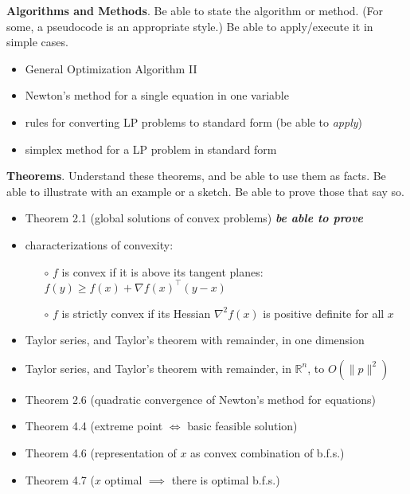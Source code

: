 \documentclass[12pt]{amsart}
\newcommand{\bigspacing}{\renewcommand{\baselinestretch}{1.13}\tiny\normalsize}
\newcommand{\RR}{{\mathbb{R}}}
\newcommand{\grad}{\nabla}
\begin{document}
\bigspacing
\noindent \textbf{Algorithms and Methods}.  Be able to state the algorithm or method.  (For some, a pseudocode is an appropriate style.)  Be able to apply/execute it in simple cases.
\begin{itemize}
\item General Optimization Algorithm II 
\item Newton's method for a single equation in one variable 
\item rules for converting LP problems to standard form (be able to \emph{apply}) 
\item simplex method for a LP problem in standard form 
\end{itemize}


\newcommand{\proveit}{\quad\textbf{\emph{be able to prove}}}

\newpage
\medskip
\noindent \textbf{Theorems}.  Understand these theorems, and be able to use them as facts.  Be able to illustrate with an example or a sketch.  Be able to prove those that say so.
\begin{itemize}
\item Theorem 2.1 (global solutions of convex problems) \proveit {}
\item characterizations of convexity: 
    \begin{itemize}
    \item[$\circ$] $f$ is convex if it is above its tangent planes: $f(y) \ge f(x) + \grad f(x)^\top (y-x)$
    \item[$\circ$] $f$ is strictly convex if its Hessian $\grad^2 f(x)$ is positive definite for all $x$
    \end{itemize}
\item Taylor series, and Taylor's theorem with remainder, in one dimension 
\item Taylor series, and Taylor's theorem with remainder, in $\RR^n$, to $O(\|p\|^2)$ 
\item Theorem 2.6 (quadratic convergence of Newton's method for equations) 
\item Theorem 4.4 (extreme point $\iff$ basic feasible solution) 
\item Theorem 4.6 (representation of $x$ as convex combination of b.f.s.) 
\item Theorem 4.7 ($x$ optimal $\implies$ there is optimal b.f.s.) 
\end{itemize}
\end{document}
